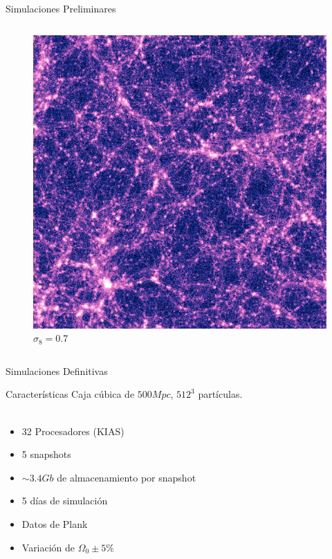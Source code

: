 \documentclass{beamer}
\begin{document}
\begin{frame}{Simulaciones Preliminares}
\begin{columns}
		\begin{column}{0.5\textwidth}
			\begin{figure}[!h]
			\begin{center}
				\includegraphics[width=\textwidth]{im/res2.png}
				\caption{$\sigma_8=0.7$} 
				\label{fig:res2}
			\end{center}
		\end{figure}
		\end{column}
	\end{columns}
\end{frame}

\begin{frame}{Simulaciones Definitivas}
	\begin{block}{Características}
		Caja cúbica de $500 Mpc$, $512^3$ partículas.\\~\\
		\begin{itemize}
			\item 32 Procesadores (KIAS)
			\item 5 snapshots
			\item $\sim 3.4Gb$ de almacenamiento por snapshot
			\item 5 días de simulación
			\item Datos de Plank
			\item Variación de $\Omega_0\pm5\%$
		\end{itemize}
	\end{block}		
	
\end{frame}
\end{document}
